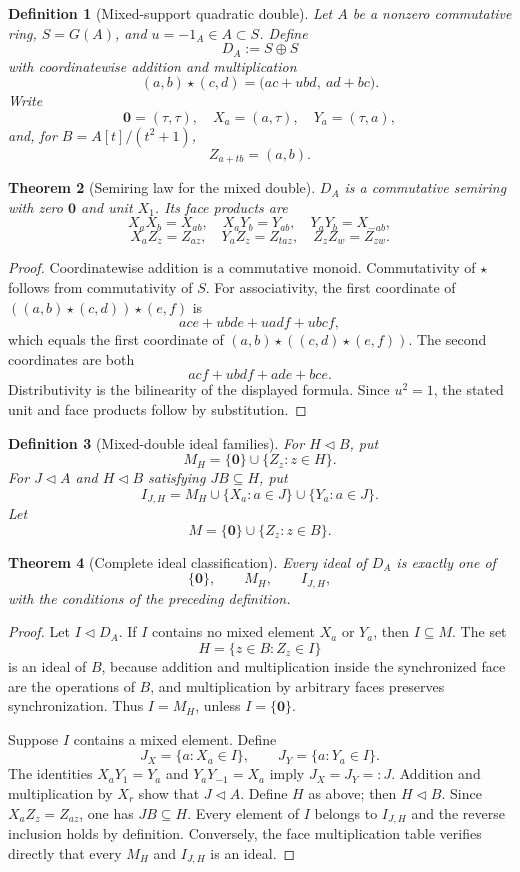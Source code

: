 \documentclass[11pt]{article}
\newtheorem{definition}{Definition}
\newtheorem{theorem}[definition]{Theorem}
\begin{document}
\begin{definition}[Mixed-support quadratic double]
Let $A$ be a nonzero commutative ring, $S=G(A)$, and $u=-1_A\in A\subset S$.  Define
\[
D_A:=S\oplus S
\]
with coordinatewise addition and multiplication
\[
(a,b)\star(c,d)=\bigl(ac+ubd,\ ad+bc\bigr).
\]
Write
\[
\mathbf0=(\tau,\tau),\quad X_a=(a,\tau),\quad Y_a=(\tau,a),
\]
and, for $B=A[t]/(t^2+1)$,
\[
Z_{a+tb}=(a,b).
\]
\end{definition}

\begin{theorem}[Semiring law for the mixed double]
$D_A$ is a commutative semiring with zero $\mathbf0$ and unit $X_1$.  Its face products are
\[
X_aX_b=X_{ab},\quad X_aY_b=Y_{ab},\quad Y_aY_b=X_{-ab},
\]
\[
X_aZ_z=Z_{az},\quad Y_aZ_z=Z_{taz},\quad Z_zZ_w=Z_{zw}.
\]
\end{theorem}

\begin{proof}
Coordinatewise addition is a commutative monoid.  Commutativity of $\star$ follows from commutativity of $S$.  For associativity, the first coordinate of $((a,b)\star(c,d))\star(e,f)$ is
\[
ace+ubde+uadf+ubcf,
\]
which equals the first coordinate of $(a,b)\star((c,d)\star(e,f))$.  The second coordinates are both
\[
acf+ubdf+ade+bce.
\]
Distributivity is the bilinearity of the displayed formula.  Since $u^2=1$, the stated unit and face products follow by substitution.
\end{proof}

\begin{definition}[Mixed-double ideal families]
For $H\triangleleft B$, put
\[
M_H=\{\mathbf0\}\cup\{Z_z:z\in H\}.
\]
For $J\triangleleft A$ and $H\triangleleft B$ satisfying $JB\subseteq H$, put
\[
I_{J,H}=M_H\cup\{X_a:a\in J\}\cup\{Y_a:a\in J\}.
\]
Let
\[
M=\{\mathbf0\}\cup\{Z_z:z\in B\}.
\]
\end{definition}

\begin{theorem}[Complete ideal classification]
Every ideal of $D_A$ is exactly one of
\[
\{\mathbf0\},\qquad M_H,\qquad I_{J,H},
\]
with the conditions of the preceding definition.
\end{theorem}

\begin{proof}
Let $I\triangleleft D_A$.  If $I$ contains no mixed element $X_a$ or $Y_a$, then $I\subseteq M$.  The set
\[
H=\{z\in B:Z_z\in I\}
\]
is an ideal of $B$, because addition and multiplication inside the synchronized face are the operations of $B$, and multiplication by arbitrary faces preserves synchronization.  Thus $I=M_H$, unless $I=\{\mathbf0\}$.

Suppose $I$ contains a mixed element.  Define
\[
J_X=\{a:X_a\in I\},\qquad J_Y=\{a:Y_a\in I\}.
\]
The identities $X_aY_1=Y_a$ and $Y_aY_{-1}=X_a$ imply $J_X=J_Y=:J$.  Addition and multiplication by $X_r$ show that $J\triangleleft A$.  Define $H$ as above; then $H\triangleleft B$.  Since $X_aZ_z=Z_{az}$, one has $JB\subseteq H$.  Every element of $I$ belongs to $I_{J,H}$ and the reverse inclusion holds by definition.  Conversely, the face multiplication table verifies directly that every $M_H$ and $I_{J,H}$ is an ideal.
\end{proof}
\end{document}
